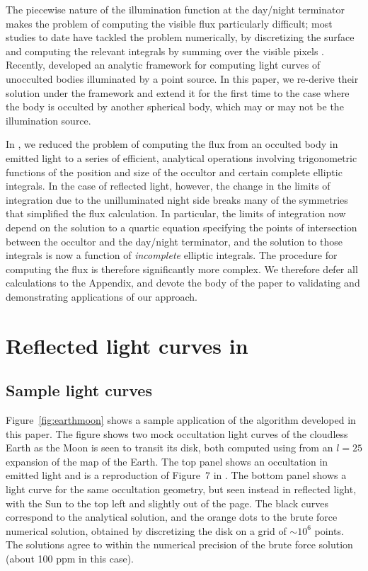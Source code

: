 \documentclass[modern]{aastex62}
\begin{document}
The piecewise nature of the illumination function at the day/night terminator
makes the problem of computing the visible flux particularly difficult; most
studies to date have tackled the problem numerically, by discretizing the surface
and computing the relevant integrals by summing over the visible
pixels . Recently, \citep{Haggard2018} developed an analytic
framework for computing light curves of unocculted bodies illuminated
by a point source. In this paper, we re-derive their solution under the
\starry framework and extend it for the first time to the case where
the body is occulted by another spherical body, which may or may not be the
illumination source.

In \citet{Luger2019}, we reduced the problem of computing the flux from
an occulted body in emitted light to a series of efficient, analytical
operations involving trigonometric functions of the position and size of the
occultor and certain complete elliptic integrals. In the case of reflected
light, however, the change in the limits of integration due to the
unilluminated night side breaks many of the symmetries that simplified
the flux calculation. In particular, the limits of integration now depend
on the solution to a quartic equation specifying the points of intersection
between the occultor and the day/night terminator, and the solution to
those integrals is now a function of \emph{incomplete} elliptic integrals.
The procedure for computing the flux is therefore significantly more complex.
%
We therefore defer all calculations to the Appendix, and devote the body of
the paper to validating and demonstrating applications of our approach.

\section{Reflected light curves in \starry}
\label{sec:validation}

\subsection{Sample light curves}
\label{sec:sample}

Figure~\ref{fig:earthmoon} shows a sample application of the algorithm
developed in this paper. The figure shows two mock occultation light curves
of the cloudless Earth as the Moon is seen to transit its disk, both computed
using \starry from an $l=25$ expansion of the map of the Earth.
The top panel shows an occultation in emitted light and is a reproduction of
Figure~7 in \citet{Luger2019}. The bottom panel shows a light curve for the
same occultation geometry, but seen instead in reflected light, with the
Sun to the top left and slightly out of the page.
The black curves correspond to the analytical solution, and the orange dots
to the brute force numerical solution, obtained by discretizing the disk
on a grid of ${\sim}10^6$ points. The solutions agree to within the
numerical precision of the brute force solution (about 100 ppm in this
case).
\end{document}
